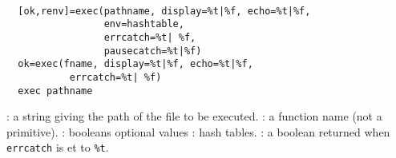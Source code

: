 \begin{mandesc}
   \\ %
\end{mandesc}
\begin{calling_sequence}
\begin{verbatim}
  [ok,renv]=exec(pathname, display=%t|%f, echo=%t|%f,
                 env=hashtable,
                 errcatch=%t| %f,
                 pausecatch=%t|%f)
  ok=exec(fname, display=%t|%f, echo=%t|%f,
           errcatch=%t| %f) 
  exec pathname
\end{verbatim}
\end{calling_sequence}
\begin{parameters}
  \begin{varlist}
    : a string giving the path of the file to be executed.
    : a function name (not a primitive).
    : booleans optional values
    : hash tables. 
    : a boolean returned when \verb!errcatch! is et to \verb!%t!.
  \end{varlist}
\end{parameters}
